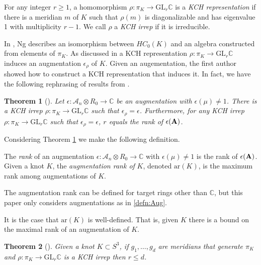 \documentclass[11pt]{amsart}
\def\C{{\mathbb C}}
\def\A{{\mathcal A}}
\newtheorem{thm}{Theorem}[section]
\newenvironment{definition}[1][Definition]{\begin{trivlist}
\item[\hskip \labelsep {\bfseries #1}]}{\end{trivlist}}
\newenvironment{rem}[1][Remark]{\begin{trivlist}
\item[\hskip \labelsep {\bfseries #1}]}{\end{trivlist}}
\begin{document}
  \begin{definition}
  For any integer $r\ge1$, a homomorphism $\rho:\pi_K\to\text{GL}_r\C$ is a \emph{KCH representation} if there is a meridian $m$ of $K$ such that $\rho(m)$ is diagonalizable and has eigenvalue 1 with multiplicity $r-1$. We call $\rho$ a \emph{KCH irrep} if it is irreducible.
  \label{defn:KCHReps}
  \end{definition}

  In \cite{Ng08}, Ng describes an isomorphism between $HC_0(K)$ and an algebra constructed from elements of $\pi_K$. As discussed in \cite{Ng12}a KCH representation $\rho:\pi_K\to\text{GL}_r\C$ induces an augmentation $\epsilon_\rho$ of $K$. Given an augementation, the first author showed how to construct a KCH representation that induces it. In fact, we have the following rephrasing of results from \cite{Cor13a}.

  \begin{thm}[\cite{Cor13a}]
  Let $\epsilon:\A_n\otimes R_0\to\C$ be an augmentation with $\epsilon(\mu)\ne 1$. There is a KCH irrep $\rho:\pi_K\to\text{GL}_r\C$ such that $\epsilon_\rho=\epsilon$. Furthermore, for any KCH irrep $\rho:\pi_K\to\text{GL}_r\C$ such that $\epsilon_\rho = \epsilon$, $r$ equals the rank of $\epsilon({\bf A})$.
  \label{thm:AugKCH_Corresp}
  \end{thm}

  Considering Theorem \ref{thm:AugKCH_Corresp} we make the following definition.

  \begin{definition}
  The \emph{rank} of an augmentation $\epsilon:\A_n\otimes R_0\to\C$ with $\epsilon(\mu)\ne 1$ is the rank of $\epsilon({\bf A})$. Given a knot $K$, the \emph{augmentation rank of } $K$, denoted $\text{ar}(K)$, is the maximum rank among augmentations of $K$.
  \label{defn:AugRk}
  \end{definition}

  \begin{rem} The augmentation rank can be defined for target rings other than $\C$, but this paper only considers augmentations as in \ref{defn:Aug}.
  \end{rem}

  It is the case that $\text{ar}(K)$ is well-defined. That is, given $K$ there is a bound on the maximal rank of an augmentation of $K$.

  \begin{thm}[\cite{Cor13b}] Given a knot $K\subset S^3$, if $g_1,\ldots,g_d$ are meridians that generate $\pi_K$ and $\rho:\pi_K\to\text{GL}_r\C$ is a KCH irrep then $r\le d$.
  \label{thm:DimBound}
  \end{thm}
\end{document}

